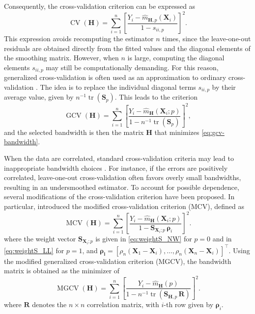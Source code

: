 \documentclass[12pt]{report} %
\newcommand{\bH}{\mathbf{H}}
\newcommand{\bX}{\mathbf{X}}
\begin{document}
Consequently, the cross-validation criterion can be expressed as
\begin{equation}
    \label{eq:cv-bandwidth-smoothing}
    \operatorname{CV}(\bH)
    =\sum_{i=1}^{n}\left[\frac{ Y_i-\hat{m}_{\bH, p}(\bX_i)}{1-s_{ii,p}}
    \right]^2.
\end{equation}
This expression avoids recomputing the estimator $n$ times, since the leave-one-out residuals are obtained directly from the fitted values and the diagonal elements of the smoothing matrix.  However, when $n$ is large, computing the diagonal elements $s_{ii,p}$ may still be computationally demanding. For this reason, generalized cross-validation is often used as an approximation to ordinary cross-validation \citep{Craven1979}. The idea is to replace the individual diagonal terms $s_{ii,p}$ by their average value, given by $n^{-1}\operatorname{tr}(\mathbf{S}_{p})$. This leads to the criterion
\begin{equation}
    \label{eq:gcv-bandwidth}
    \operatorname{GCV}(\bH)=\sum_{i=1}^{n}
    \left[\frac{Y_i-\hat{m}_{\bH}(\bX_i;p)
        }{ 1-n^{-1}\operatorname{tr}(\mathbf{S}_{p})}\right]^2,
\end{equation}
and the selected bandwidth is then the matrix $\bH$ that minimizes
\eqref{eq:gcv-bandwidth}.

When the data are correlated, standard cross-validation criteria may lead to inappropriate bandwidth choices \citep{Altman1990, Opsomer2001}. For instance, if the errors are positively correlated, leave-one-out cross-validation often favors overly small bandwidths, resulting in an undersmoothed estimator. To account for possible dependence, several modifications of the cross-validation criterion have been proposed. In particular, \citet{Liu2001} introduced the modified cross-validation criterion (MCV), defined as 
\begin{equation}
    \label{eq:mcv-bandwidth}
    \operatorname{MCV}(\bH) =
    \sum_{i=1}^{n} \left[ \frac{ Y_i-\hat{m}_{\bH}(\bX_i;p)}{ 1-\mathbf{S}_{\bX_i; p} \,\boldsymbol{\rho}_i}\right]^2.
\end{equation}
where the weight vector $\mathbf{S}_{\bX_i;p}$ is given in \eqref{eq:weightS_NW} for $p = 0$ and in \eqref{eq:weightS_LL} for $p = 1$,  and $\boldsymbol{\rho_i} = [\rho_n(\bX_1 - \bX_i), \dots, \rho_n(\bX_n - \bX_i)]^\top$. Using the modified generalized cross-validation criterion (MGCV), the bandwidth matrix is obtained as the minimizer of
\begin{equation}
    \label{eq:mgcv-bandwidth}
    \operatorname{MGCV}(\bH) =
    \sum_{i=1}^{n} \left[\frac{ Y_i-\hat{m}_{\bH}(p)}{ 1- n^{-1}\operatorname{tr}(\mathbf{S}_{\bH, p} \,\mathbf{R})}\right]^2.
\end{equation}
where $\mathbf{R}$ denotes the $n\times n$ correlation matrix, with $i$-th row given by $\boldsymbol{\rho}_i$.
\end{document}
